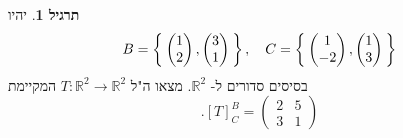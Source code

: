 \documentclass[12pt]{report}
\theoremstyle{plain}
\theoremstyle{definition}
\newtheorem{exercise}{תרגיל}[chapter]
\newcommand{\R}{\mathbb{R}}
\newcommand{\0}{\mathbf{0}}
\begin{document}
\begin{exercise}
יהיו 
$$
B=\Set{\begin{pmatrix}1\\2\end{pmatrix},\begin{pmatrix}3\\1\end{pmatrix}},\quad C=\Set{\begin{pmatrix}1\\-2\end{pmatrix},\begin{pmatrix}1\\3\end{pmatrix}}
$$
בסיסים סדורים ל-
$\R^2$.
מצאו ה"ל
$T:\R^2\to\R^2$
המקיימת
$$
.[T]_C^B=\begin{pmatrix}
2 & 5 \\
3 & 1
\end{pmatrix}
$$
\end{exercise}
\end{document}
